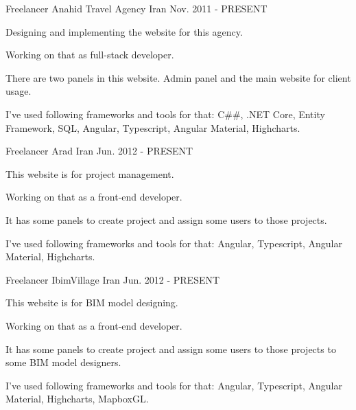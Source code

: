 

\begin{cventries}

  \cventry
    {Freelancer} %
    {Anahid Travel Agency} %
    {Iran} %
    {Nov. 2011 - PRESENT} %
    {
      \begin{cvitems} %
        \item {Designing and implementing the website for this agency.}
        \item {Working on that as full-stack developer.}
        \item {There are two panels in this website. Admin panel and the main website for client usage.}
        \item {I've used following frameworks and tools for that: C##, .NET Core, Entity Framework, SQL, Angular, Typescript, Angular Material, Highcharts.}
      \end{cvitems}
    }

  \cventry
    {Freelancer} %
    {Arad} %
    {Iran} %
    {Jun. 2012 - PRESENT} %
    {
      \begin{cvitems} %
        \item {This website is for project management.}
        \item {Working on that as a front-end developer.}
        \item {It has some panels to create project and assign some users to those projects.}
        \item {I've used following frameworks and tools for that: Angular, Typescript, Angular Material, Highcharts.}
      \end{cvitems}
    }

\cventry
{Freelancer} %
{IbimVillage} %
{Iran} %
{Jun. 2012 - PRESENT} %
{
	\begin{cvitems} %
		\item {This website is for BIM model designing.}
		\item {Working on that as a front-end developer.}
		\item {It has some panels to create project and assign some users to those projects to some BIM model designers.}
		\item {I've used following frameworks and tools for that: Angular, Typescript, Angular Material, Highcharts, MapboxGL.}
	\end{cvitems}
}

\end{cventries}
